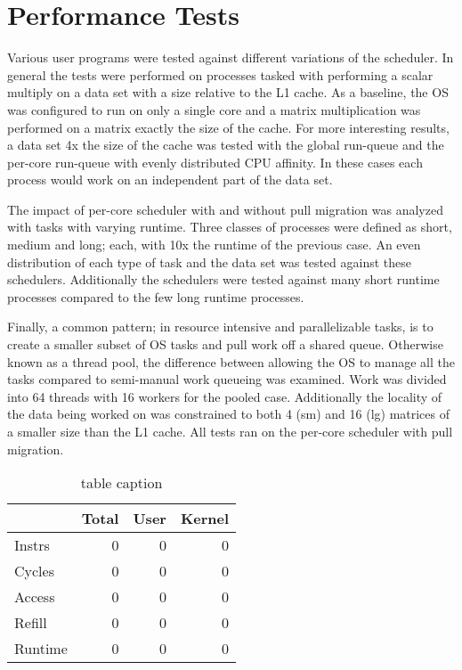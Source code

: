 \documentclass{cys}
\begin{document}
\section{Performance Tests}
\label{sec:perfTests}
Various user programs were tested against different variations of the scheduler.  In general the tests were performed on processes tasked with performing a scalar multiply on a data set with a size relative to the L1 cache.  As a baseline, the OS was configured to run on only a single core and a matrix multiplication was performed on a matrix exactly the size of the cache.  For more interesting results, a data set 4x the size of the cache was tested with the global run-queue and the per-core run-queue with evenly distributed CPU affinity.  In these cases each process would work on an independent part of the data set.  

The impact of per-core scheduler with and without pull migration was analyzed with tasks with varying runtime.  Three classes of processes were defined as short, medium and long; each, with 10x the runtime of the previous case.  An even distribution of each type of task and the data set was tested against these schedulers.  Additionally the schedulers were tested against many short runtime processes compared to the few long runtime processes.

Finally, a common pattern; in resource intensive and parallelizable tasks, is to create a smaller subset of OS tasks and pull work off a shared queue.  Otherwise known as a thread pool, the difference between allowing the OS to manage all the tasks compared to semi-manual work queueing was examined.  Work was divided into 64 threads with 16 workers for the pooled case.  Additionally the locality of the data being worked on was constrained to both 4 (sm) and 16 (lg) matrices of a smaller size than the L1 cache.  All tests ran on the per-core scheduler with pull migration.  

\begin{table}[h!]
    \centering
    \begin{tabular}{ l|rrr }
        & Total & User & Kernel \\
        \hline
        Instrs & 0 & 0 & 0 \\
        Cycles & 0 & 0 & 0 \\
        Access & 0 & 0 & 0 \\
        Refill & 0 & 0 & 0 \\
        Runtime & 0 & 0 & 0 \\
        \hline
    \end{tabular}
    \caption{table caption}        
\end{table}
\end{document}
